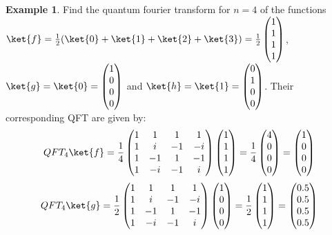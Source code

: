 \documentclass[12pt, oneside]{book}
\theoremstyle{definition}
\theoremstyle{definition}
\newtheorem{example}{Example}[section]
\theoremstyle{remark}
\begin{document}
\begin{example}
    Find the quantum fourier transform for $n=4$ of the functions $\ket{f}=\frac{1}{2}(\ket{0}+\ket{1}+\ket{2}+\ket{3})=\frac{1}{2}\begin{pmatrix} 1 \\ 1 \\ 1 \\ 1 \end{pmatrix}$,
    $\ket{g}=\ket{0}= \begin{pmatrix} 1 \\ 0 \\ 0 \\ 0 \end{pmatrix}$ and $\ket{h}=\ket{1}= \begin{pmatrix} 0 \\ 1 \\ 0 \\ 0 \end{pmatrix}$.
    Their corresponding QFT are given by:
    \[ QFT_4\ket{f}=\dfrac{1}{4}\begin{pmatrix} 1 & 1 & 1 & 1 \\ 1 & i & -1 & -i \\ 1 & -1 & 1 & -1 \\ 1 & -i & -1 & i \end{pmatrix}\begin{pmatrix} 1 \\ 1 \\ 1 \\ 1 \end{pmatrix}=\dfrac{1}{4}\begin{pmatrix} 4 \\ 0 \\ 0 \\ 0 \end{pmatrix}=\begin{pmatrix} 1 \\ 0 \\ 0 \\ 0 \end{pmatrix} \]
    \[ QFT_4\ket{g}=\dfrac{1}{2}\begin{pmatrix} 1 & 1 & 1 & 1 \\ 1 & i & -1 & -i \\ 1 & -1 & 1 & -1 \\ 1 & -i & -1 & i \end{pmatrix}\begin{pmatrix} 1 \\ 0 \\ 0 \\ 0 \end{pmatrix}=\dfrac{1}{2}\begin{pmatrix} 1 \\ 1 \\ 1 \\ 1 \end{pmatrix}=\begin{pmatrix} 0.5 \\ 0.5 \\ 0.5 \\ 0.5 \end{pmatrix} \]

\end{example}
\end{document}
